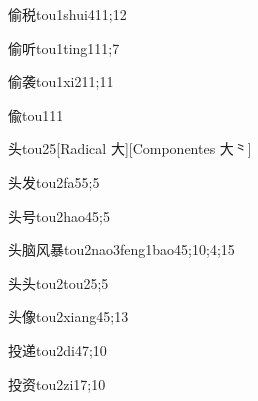 \begin{verbete}{偷税}{tou1shui4}{11;12}
\end{verbete}

\begin{verbete}{偷听}{tou1ting1}{11;7}
\end{verbete}

\begin{verbete}{偷袭}{tou1xi2}{11;11}
\end{verbete}

\begin{verbete}{偸}{tou1}{11}
\end{verbete}

\begin{verbete}{头}{tou2}{5}[Radical 大][Componentes 大⺀]
\end{verbete}

\begin{verbete}{头发}{tou2fa5}{5;5}
\end{verbete}

\begin{verbete}{头号}{tou2hao4}{5;5}
\end{verbete}

\begin{verbete}{头脑风暴}{tou2nao3feng1bao4}{5;10;4;15}
\end{verbete}

\begin{verbete}{头头}{tou2tou2}{5;5}
\end{verbete}

\begin{verbete}{头像}{tou2xiang4}{5;13}
\end{verbete}

\begin{verbete}{投递}{tou2di4}{7;10}
\end{verbete}

\begin{verbete}{投资}{tou2zi1}{7;10}
\end{verbete}

